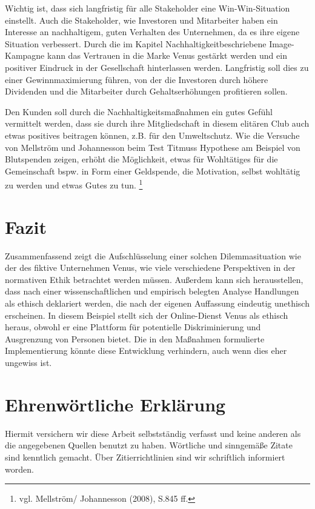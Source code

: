 \documentclass[a4paper, fontsize=12pt, parskip=full, toc=bibliographynumbered]{scrreprt}
\begin{document}
Wichtig ist, dass sich langfristig für alle Stakeholder eine Win-Win-Situation einstellt. Auch die Stakeholder, wie Investoren und Mitarbeiter haben ein Interesse an nachhaltigem, guten Verhalten des Unternehmen, da es ihre eigene Situation verbessert. Durch die im Kapitel \glqq Nachhaltigkeit\grqq beschriebene Image-Kampagne kann das
Vertrauen in die Marke Venus gestärkt werden und ein positiver Eindruck in der Gesellschaft hinterlassen werden. Langfristig soll dies zu einer Gewinnmaximierung führen, von der die Investoren durch höhere Dividenden und die Mitarbeiter durch Gehaltserhöhungen profitieren sollen.

Den Kunden soll durch die Nachhaltigkeitsmaßnahmen ein gutes Gefühl vermittelt werden, dass sie durch ihre Mitgliedschaft in diesem elitären Club auch etwas positives beitragen können, z.B. für den Umweltschutz. Wie die Versuche von Mellström und Johannesson beim Test Titmuss Hypothese am Beispiel von Blutspenden zeigen, erhöht die Möglichkeit, etwas für Wohltätiges für die Gemeinschaft bspw. in Form einer Geldspende, die Motivation, selbst wohltätig zu werden und etwas Gutes zu tun. \footnote{vgl. Mellström/ Johannesson (2008), S.845 ff.} 

\chapter{Fazit}

Zusammenfassend zeigt die Aufschlüsselung einer solchen Dilemmasituation wie der des fiktive Unternehmen Venus, wie viele verschiedene Perspektiven in der normativen Ethik betrachtet werden müssen. Außerdem kann sich herausstellen, dass nach einer wissenschaftlichen und empirisch belegten Analyse Handlungen als ethisch deklariert werden, die nach der eigenen Auffassung eindeutig unethisch erscheinen. In diesem Beispiel stellt sich der Online-Dienst Venus als ethisch heraus, obwohl er eine Plattform für potentielle Diskriminierung und Ausgrenzung von Personen bietet. Die in den Maßnahmen formulierte Implementierung könnte diese Entwicklung verhindern, auch wenn dies eher ungewiss ist. 

\chapter{Ehrenwörtliche Erklärung}

Hiermit versichern wir diese Arbeit selbstständig verfasst und keine
anderen als die angegebenen Quellen benutzt zu haben.  Wörtliche und
sinngemäße Zitate sind kenntlich gemacht.  Über Zitierrichtlinien
sind wir schriftlich informiert worden.
\end{document}
